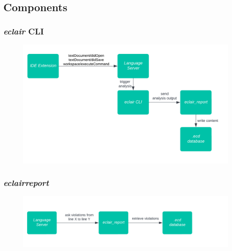 \documentclass[compress,xcolor={dvipsnames}]{beamer}
\begin{document}
\subsection{Components}

\begin{frame}
  \frametitle{\emph{eclair} CLI}
  \large

  \begin{figure}[ht]
    \centering
    \includegraphics[width=1.0\textwidth]{./eclair_analyzer_flow.png}
    \label{fig:one}
  \end{figure}
\end{frame}

\begin{frame}
  \frametitle{\emph{eclair\textunderscore report}}
  \large

  \begin{figure}[ht]
    \centering
    \includegraphics[width=1.0\textwidth]{./eclair_report_flow.jpg}
    \label{fig:one}
  \end{figure}
\end{frame}
\end{document}
